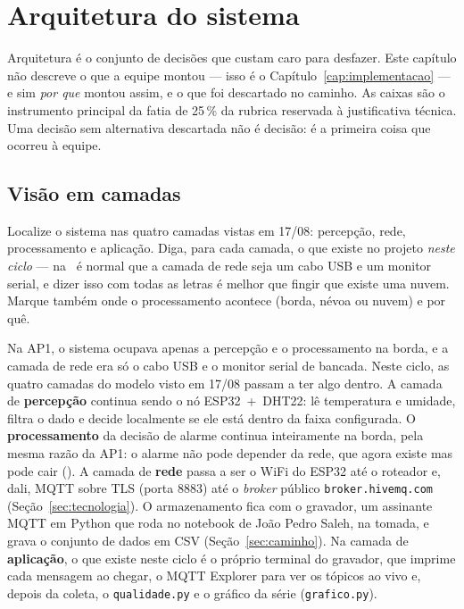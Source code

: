 \chapter{Arquitetura do sistema}
\label{cap:arquitetura}
\rubricaJustificativa

\begin{orientacao}
Arquitetura é o conjunto de decisões que custam caro para desfazer.
Este capítulo não descreve o que a equipe montou --- isso é o
Capítulo~\ref{cap:implementacao} --- e sim \emph{por que} montou assim,
e o que foi descartado no caminho. As caixas  são o instrumento
principal da fatia de 25\,\% da rubrica reservada à justificativa
técnica. Uma decisão sem alternativa descartada não é decisão: é a
primeira coisa que ocorreu à equipe.
\end{orientacao}

\section{Visão em camadas}

\begin{orientacao}
Localize o sistema nas quatro camadas vistas em 17/08: percepção, rede,
processamento e aplicação. Diga, para cada camada, o que existe no
projeto \emph{neste ciclo} --- na \rotuloAP\ é normal que a camada de
rede seja um cabo USB e um monitor serial, e dizer isso com todas as
letras é melhor que fingir que existe uma nuvem. Marque também onde o
processamento acontece (borda, névoa ou nuvem) e por quê.
\end{orientacao}

Na AP1, o sistema ocupava apenas a percepção e o processamento na borda,
e a camada de rede era só o cabo USB e o monitor serial de bancada.
Neste ciclo, as quatro camadas do modelo visto em 17/08 passam a ter
algo dentro. A camada de \textbf{percepção} continua sendo o nó
ESP32~+~DHT22: lê temperatura e umidade, filtra o dado e decide
localmente se ele está dentro da faixa configurada. O
\textbf{processamento} da decisão de alarme continua inteiramente na
borda, pela mesma razão da AP1: o alarme não pode depender da rede, que
agora existe mas pode cair (). A camada de \textbf{rede} passa a
ser o WiFi do ESP32 até o roteador e, dali, MQTT sobre TLS (porta 8883)
até o \emph{broker} público \texttt{broker.hivemq.com}
(Seção~\ref{sec:tecnologia}). O armazenamento fica com o gravador, um
assinante MQTT em Python que roda no notebook de João Pedro Saleh,
na tomada, e grava o conjunto de dados em CSV
(Seção~\ref{sec:caminho}). Na camada de \textbf{aplicação}, o que existe
neste ciclo é o próprio terminal do gravador, que imprime cada mensagem
ao chegar, o MQTT Explorer para ver os tópicos ao vivo e, depois da
coleta, o \texttt{qualidade.py} e o gráfico da série
(\texttt{grafico.py}).

